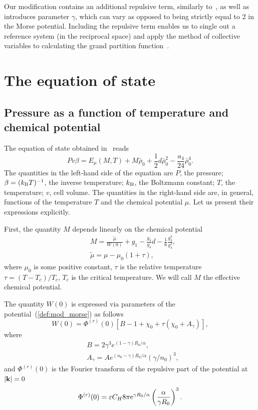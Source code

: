 Our modification contains an additional repulsive term, similarly to~\cite{MartinezValenciaEtAl2013}, as well as introduces parameter $\gamma$, which can vary as opposed to being strictly equal to 2 in the Morse potential. Including the repulsive term enables us to single out a reference system (in the reciprocal space) and apply the method of collective variables to calculating the grand partition function~\cite{KozlovskiiDobush2016}.

\section{\label{sec:eos}The equation of state}
\subsection{Pressure as a function of temperature and chemical potential}
The equation of state obtained in~\cite{KozlovskiiDobush2020} reads
\begin{equation}
	\label{eq:eosMT}
	Pv\beta = E_\mu(M, T) + M \bar \rho_0 + \frac{1}{2} d \bar \rho_0^2 - \frac{a_4}{24} \bar \rho_0^4.
\end{equation}
The quantities in the left-hand side of the equation are $P$, the pressure; $\beta = (k_{\rm B} T)^{-1}$, the inverse temperature; $k_{\rm B}$, the Boltzmann constant; $T$, the temperature; $v$, cell volume. The quantities in the right-hand side are, in general, functions of the temperature $T$ and the chemical potential $\mu$. Let us present their expressions explicitly.

First, the quantity $M$ depends linearly on the chemical potential
\begin{align}\label{chem_pot}
	&	M = \frac{\tilde\mu}{W(0)} + g_1 - \frac{g_3}{g_4} d - \frac{1}{6} \frac{g_3^3}{g_4^2}, \\
	&	\tilde\mu=\mu-\mu_0(1+\tau),
\end{align}
where $\mu_0$ is some positive constant, $\tau$ is the relative temperature $\tau = (T - T_c) / T_c$, $T_c$ is the critical temperature. We will call $M$ the effective chemical potential.

The quantity $W(0)$ is expressed via parameters of the potential~(\ref{def:mod_morse}) as follows
\begin{equation}
	W(0) = \Phi^{(r)}(0) \left[ B - 1 + \chi_0 + \tau (\chi_0 + A_\gamma) \right],
\end{equation}
where
\begin{align*} 
	& B = 2 \gamma^3 e^{(1-\gamma)R_0/\alpha},
	\nonumber \\
	& A_\gamma = A e^{(n_0-\gamma)R_0/\alpha} \left( \gamma / n_0\right)^3, 
\end{align*}
and $\Phi^{(r)}(0)$ is the Fourier transform of the repulsive part of the potential at $\abs{\vb k}=0$
\begin{equation*}
	\Phi^{(r)}(0) = \varepsilon C_H 8\pi {\rm e}^{\gamma R_0/\alpha} \left(\frac{\alpha}{\gamma R_0}\right)^3.
\end{equation*}

